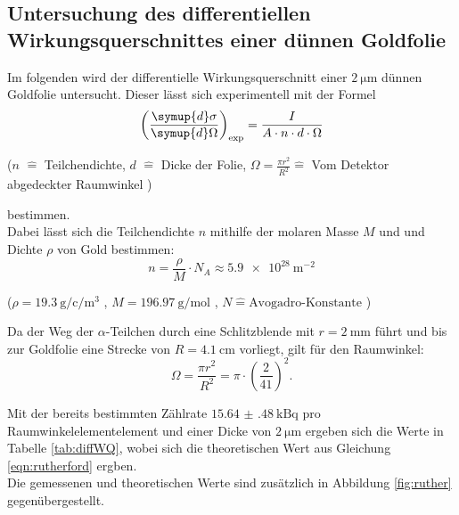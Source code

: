 \subsection{Untersuchung des differentiellen Wirkungsquerschnittes einer dünnen Goldfolie} \label{chap:dsdO}
Im folgenden wird der differentielle Wirkungsquerschnitt einer $\SI{2}{\micro \meter}$ dünnen Goldfolie untersucht. Dieser lässt sich experimentell mit der Formel \cite{Kroeninger}
\begin{equation}
    \left(\frac{\symup{d}\sigma}{\symup{d}\Omega}\right)_\text{exp} = \frac{I}{A \cdot n \cdot d \cdot \Omega}
    \label{eqn:dsdO_exp}
\end{equation}
\begin{center}
    \tiny{($n$ $\hat=$ Teilchendichte, $d$ $\hat=$ Dicke der Folie, $\Omega = \frac{\pi r^2}{R^2} \hat{=}$ Vom Detektor abgedeckter Raumwinkel )}
\end{center}
bestimmen. \\
Dabei lässt sich die Teilchendichte $n$ mithilfe der molaren Masse $M$ und und Dichte $\rho$ von Gold bestimmen:
\begin{equation}
    n =  \frac{\rho}{M} \cdot N_A \approx \SI{5.9 e28}{\meter^{-2}}
\end{equation}
\begin{center}
    \tiny{($\rho = \SI{19,3}{\gram \per \centi \per \meter^3 } $ \cite{Elemente16}, $M = \SI{196,97}{\gram \per \mol } $ \cite{Elemente16}, $ N \hat{=} \text{Avogadro-Konstante} $ )}
\end{center}

Da der Weg der $\alpha$-Teilchen durch eine Schlitzblende mit $r = \SI{2}{\milli \meter} $ führt und bis zur Goldfolie eine Strecke von $R = \SI{4,1}{\centi \meter}$ vorliegt, gilt für den Raumwinkel:
\begin{equation}
    \Omega = \frac{\pi r^2}{R^2} = \pi \cdot \left( \frac{2}{41} \right)^2 .
\end{equation}

Mit der bereits bestimmten Zählrate $\SI{15.64(48)}{\kilo\becquerel}$ pro Raumwinkelelementelement und einer Dicke von $\SI{2}{\micro \meter}$ ergeben sich die Werte in Tabelle \ref{tab:diffWQ}, wobei sich die theoretischen Wert aus Gleichung \eqref{eqn:rutherford} ergben. \\
Die gemessenen und theoretischen Werte sind zusätzlich in Abbildung \ref{fig:ruther} gegenübergestellt.


